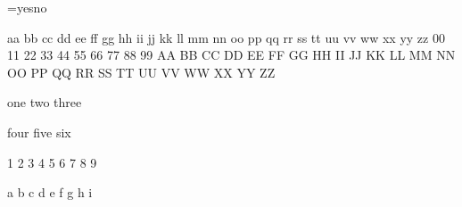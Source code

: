 \documentclass{article}
\begin{document}

\the\XeTeXupwardsmode

=\XeTeXupwardsmode yes\else no\fi

aa bb cc dd ee ff gg hh ii jj kk ll mm nn oo pp qq rr ss tt uu vv ww xx yy zz
00 11 22 33 44 55 66 77 88 99
AA BB CC DD EE FF GG HH II JJ KK LL MM NN OO PP QQ RR SS TT UU VV WW XX YY ZZ


one two three

\vspace{\baselineskip}

four five six

\parbox{1cm}{1 2 3 4 5 6 7 8 9}

\parbox{1cm}{a b c d e f g h i}
\end{document}
